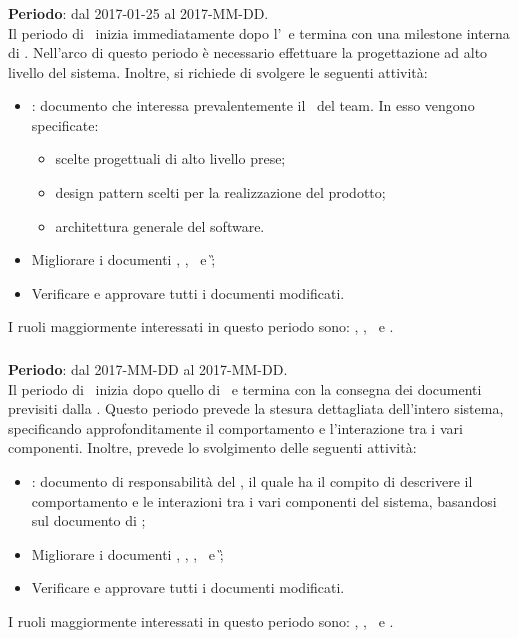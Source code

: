 		\subsubsection{\PA}
		\textbf{Periodo}: dal 2017-01-25 al 2017-MM-DD.\\
		Il periodo di \PA\ inizia immediatamente dopo l'\AR\ e termina con una milestone interna di \RPMin. Nell'arco di questo periodo è necessario effettuare la progettazione ad alto livello del sistema. Inoltre, si richiede di svolgere le seguenti attività:
		\begin{itemize}
			\item \textit{\ST}: documento che interessa prevalentemente il \Prog\ del team. In esso vengono specificate:
			\begin{itemize}
				\item scelte progettuali di alto livello prese;
				\item design pattern scelti per la realizzazione del prodotto;
				\item architettura generale del software.
			\end{itemize}
			\item Migliorare i documenti \NdP, \PdP, \PdQ\ e \G;
			\item Verificare e approvare tutti i documenti modificati.
		\end{itemize}
		I ruoli maggiormente interessati in questo periodo sono: \Amm, \Res, \Prog\ e \Ver.
	
		\subsubsection{\PD}
		\textbf{Periodo}: dal 2017-MM-DD al 2017-MM-DD.\\
		Il periodo di \PD\ inizia dopo quello di \PA\ e termina con la consegna dei documenti previsiti dalla \RP. Questo periodo prevede la stesura dettagliata dell’intero sistema, specificando approfonditamente
		il comportamento e l’interazione tra i vari componenti.
		Inoltre, prevede lo svolgimento delle seguenti attività:
		\begin{itemize}
			\item \textit{\DDP}: documento di responsabilità del \Prog, il quale ha il compito di descrivere il comportamento	e le interazioni tra i vari componenti del sistema, basandosi sul documento di \ST;
			\item  Migliorare i documenti \NdP, \PdP, \PdQ, \ST\ e \G;
			\item Verificare e approvare tutti i documenti modificati.
		\end{itemize}
		I ruoli maggiormente interessati in questo periodo sono: \Amm, \Res, \Prog\ e \Ver.
		
